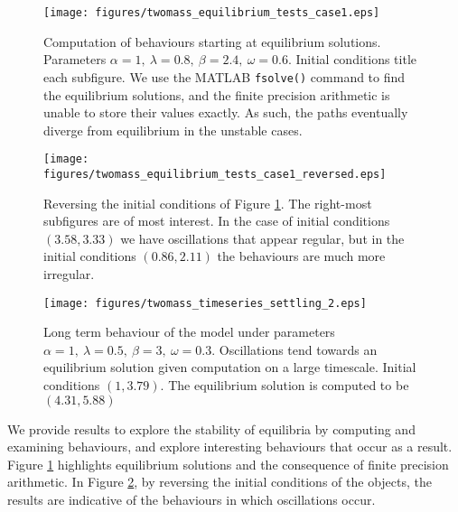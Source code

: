 \documentclass{article}
\begin{document}
\begin{figure}
    \centering
    \texttt{[image: figures/twomass\_equilibrium\_tests\_case1.eps]}
    \caption{
        Computation of behaviours starting at equilibrium solutions.
        Parameters \(\alpha=1,~\lambda=0.8,~\beta=2.4,~\omega=0.6\).
        Initial conditions title each subfigure.
        We use the MATLAB \texttt{fsolve()} command to find the equilibrium solutions,
        and the finite precision arithmetic is unable to store their values exactly.
        As such, the paths eventually diverge from equilibrium in the unstable cases.
    }
    \label{fig:twomass_equilibria_timeseries}
\end{figure}

\begin{figure}
    \centering
    \texttt{[image: figures/twomass\_equilibrium\_tests\_case1\_reversed.eps]}
    \caption{
        Reversing the initial conditions of Figure \ref{fig:twomass_equilibria_timeseries}.
        The right-most subfigures are of most interest.
        In the case of initial conditions \((3.58,3.33)\) we have oscillations that appear regular,
        but in the initial conditions \((0.86,2.11)\) the behaviours are much more irregular.
    }
    \label{fig:twomass_equilibria_timeseries_2}
\end{figure}

\begin{figure}
    \centering
    \texttt{[image: figures/twomass\_timeseries\_settling\_2.eps]}
    \caption{
        Long term behaviour of the model under parameters \(\alpha=1,~\lambda=0.5,~\beta=3,~\omega=0.3\).
        Oscillations tend towards an equilibrium solution given computation on a large timescale.
        Initial conditions \((1,3.79)\).
        The equilibrium solution is computed to be $(4.31,5.88)$
    }
    \label{fig:twomass_timeseries_settling}
\end{figure}

We provide results to explore the stability of equilibria by computing and examining behaviours,
and explore interesting behaviours that occur as a result.
Figure \ref{fig:twomass_equilibria_timeseries} highlights equilibrium solutions and the consequence of finite precision arithmetic.
In Figure \ref{fig:twomass_equilibria_timeseries_2}, by reversing the initial conditions of the objects,
the results are indicative of the behaviours in which oscillations occur.
\end{document}
